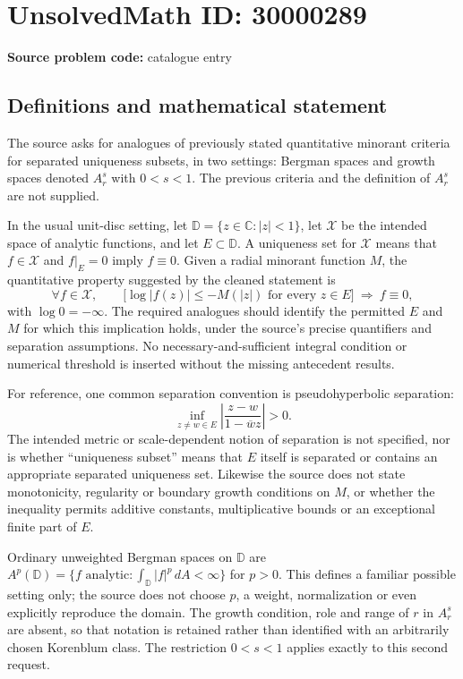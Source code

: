 \documentclass[11pt]{article}
\newcommand{\C}{\mathbb{C}}
\begin{document}
\section*{UnsolvedMath ID: 30000289}
\textbf{Source problem code:} catalogue entry
\subsection{Definitions and mathematical statement}
The source asks for analogues of previously stated quantitative minorant criteria for separated uniqueness subsets, in two settings: Bergman spaces and growth spaces denoted \(A_r^s\) with \(0<s<1\). The previous criteria and the definition of \(A_r^s\) are not supplied.

In the usual unit-disc setting, let \(\mathbb D=\{z\in\C:|z|<1\}\), let \(\mathcal X\) be the intended space of analytic functions, and let \(E\subset\mathbb D\). A uniqueness set for \(\mathcal X\) means that \(f\in\mathcal X\) and \(f|_E=0\) imply \(f\equiv0\). Given a radial minorant function \(M\), the quantitative property suggested by the cleaned statement is
\[
 \forall f\in\mathcal X,\qquad
 \bigl[\log|f(z)|\leq-M(|z|)\text{ for every }z\in E\bigr]
 \ \Longrightarrow\ f\equiv0,
\]
with \(\log0=-\infty\). The required analogues should identify the permitted \(E\) and \(M\) for which this implication holds, under the source's precise quantifiers and separation assumptions. No necessary-and-sufficient integral condition or numerical threshold is inserted without the missing antecedent results.

For reference, one common separation convention is pseudohyperbolic separation:
\[
 \inf_{z\ne w\in E}\left|\frac{z-w}{1-\overline w z}\right|>0.
\]
The intended metric or scale-dependent notion of separation is not specified, nor is whether ``uniqueness subset'' means that \(E\) itself is separated or contains an appropriate separated uniqueness set. Likewise the source does not state monotonicity, regularity or boundary growth conditions on \(M\), or whether the inequality permits additive constants, multiplicative bounds or an exceptional finite part of \(E\).

Ordinary unweighted Bergman spaces on \(\mathbb D\) are \(A^p(\mathbb D)=\{f\text{ analytic}:\int_{\mathbb D}|f|^p\,dA<\infty\}\) for \(p>0\). This defines a familiar possible setting only; the source does not choose \(p\), a weight, normalization or even explicitly reproduce the domain. The growth condition, role and range of \(r\) in \(A_r^s\) are absent, so that notation is retained rather than identified with an arbitrarily chosen Korenblum class. The restriction \(0<s<1\) applies exactly to this second request.
\end{document}

